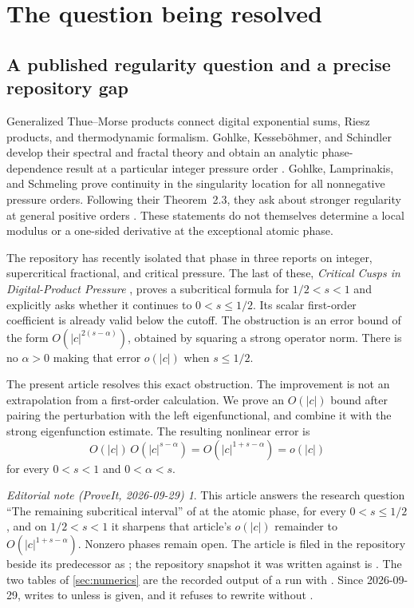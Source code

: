 \documentclass[11pt,a4paper]{article}
\numberwithin{equation}{section}
\theoremstyle{definition}
\theoremstyle{remark}
\newtheorem*{ednote}{Editorial note (ProveIt, 2026-09-29)}
\newcommand{\code}[1]{\texttt{\detokenize{#1}}}
\begin{document}
\begingroup\small\setlength{\parskip}{0pt}\tableofcontents\endgroup
\newpage

\section{The question being resolved}
\label{sec:scope}

\subsection{A published regularity question and a precise repository gap}
Generalized Thue--Morse products connect digital exponential sums,
Riesz products, and thermodynamic formalism. Gohlke, Kesseb\"ohmer, and
Schindler develop their spectral and fractal theory and obtain an
analytic phase-dependence result at a particular integer pressure order
\cite{GKS}. Gohlke, Lamprinakis, and Schmeling prove continuity in the
singularity location for all nonnegative pressure orders. Following their
Theorem~2.3, they ask about stronger regularity at general positive orders
\cite{GLS}. These statements do not themselves determine a local modulus
or a one-sided derivative at the exceptional atomic phase.

The repository has recently isolated that phase in three reports on
integer, supercritical fractional, and critical pressure. The last of
these, \emph{Critical Cusps in Digital-Product Pressure} \cite{CriticalRepo},
proves a subcritical formula for $1/2<s<1$ and explicitly asks whether it
continues to $0<s\leq1/2$. Its scalar first-order coefficient is already
valid below the cutoff. The obstruction is an error bound of the form
$O(|c|^{2(s-\alpha)})$, obtained by squaring a strong operator norm.
There is no $\alpha>0$ making that error $o(|c|)$ when $s\leq1/2$.

The present article resolves this exact obstruction. The improvement is
not an extrapolation from a first-order calculation. We prove an
$O(|c|)$ bound after pairing the perturbation with the left
eigenfunctional, and combine it with the strong eigenfunction estimate.
The resulting nonlinear error is
\[
 O(|c|)\,O(|c|^{s-\alpha})=O(|c|^{1+s-\alpha})=o(|c|)
\]
for every $0<s<1$ and $0<\alpha<s$.

\begin{ednote}
This article answers the research question ``The remaining subcritical
interval'' of \cite{CriticalRepo} at the atomic phase, for every
$0<s\le1/2$, and on $1/2<s<1$ it sharpens that article's $o(|c|)$
remainder to $O(|c|^{1+s-\alpha})$. Nonzero phases remain open. The
article is filed in the repository beside its predecessor as
; the repository
snapshot it was written against is \cite{Repo}. The two tables of
\cref{sec:numerics} are the recorded output of a run with \code{--full}.
Since 2026-09-29, \code{code/verify.py} writes to \code{recomputed/}
unless \code{--output-dir} is given, and it refuses to rewrite
\code{data/} without \code{--full}.
\end{ednote}
\end{document}
